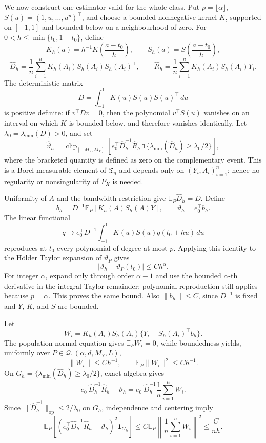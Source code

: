 We now construct one estimator valid for the whole class. Put \(p=\lfloor\alpha\rfloor\), \(S(u)=(1,u,\ldots,u^p)^\top\), and choose a bounded nonnegative kernel \(K\), supported on \([-1,1]\) and bounded below on a neighbourhood of zero. For \(0<h\le\min\{t_0,1-t_0\}\), define
\[
K_h(a)=h^{-1}K\!\left(\frac{a-t_0}{h}\right),
\qquad
S_h(a)=S\!\left(\frac{a-t_0}{h}\right),
\]
\[
\widehat D_h=\frac1n\sum_{i=1}^nK_h(A_i)S_h(A_i)S_h(A_i)^\top,
\qquad
\widehat R_h=\frac1n\sum_{i=1}^nK_h(A_i)S_h(A_i)Y_i.
\]
The deterministic matrix
\[
D=\int_{-1}^1K(u)S(u)S(u)^\top\,du
\]
is positive definite: if \(v^\top Dv=0\), then the polynomial \(v^\top S(u)\) vanishes on an interval on which \(K\) is bounded below, and therefore vanishes identically. Let \(\lambda_0=\lambda_{\min}(D)>0\), and set
\[
\widehat\vartheta_h=
\operatorname{clip}_{[-M_Y,M_Y]}\!\left[
 e_0^\top\widehat D_h^{-1}\widehat R_h\,
 \mathbf 1\{\lambda_{\min}(\widehat D_h)\ge\lambda_0/2\}
\right],
\]
where the bracketed quantity is defined as zero on the complementary event. This is a Borel measurable element of \(\mathfrak T_n\) and depends only on \((Y_i,A_i)_{i=1}^n\); hence no regularity or nonsingularity of \(P_X\) is needed.

Uniformity of \(A\) and the bandwidth restriction give \(\mathbb E_P\widehat D_h=D\). Define
\[
b_h=D^{-1}\mathbb E_P[K_h(A)S_h(A)Y],
\qquad
\vartheta_h=e_0^\top b_h.
\]
The linear functional
\[
q\longmapsto e_0^\top D^{-1}
\int_{-1}^1K(u)S(u)q(t_0+hu)\,du
\]
reproduces at \(t_0\) every polynomial of degree at most \(p\). Applying this identity to the H\"older Taylor expansion of \(\vartheta_P\) gives
\[
\lvert\vartheta_h-\vartheta_P(t_0)\rvert\le C h^\alpha.
\]
For integer \(\alpha\), expand only through order \(\alpha-1\) and use the bounded \(\alpha\)-th derivative in the integral Taylor remainder; polynomial reproduction still applies because \(p=\alpha\). This proves the same bound. Also \(\lVert b_h\rVert\le C\), since \(D^{-1}\) is fixed and \(Y\), \(K\), and \(S\) are bounded.

Let
\[
W_i=K_h(A_i)S_h(A_i)\{Y_i-S_h(A_i)^\top b_h\}.
\]
The population normal equation gives \(\mathbb E_PW_i=0\), while boundedness yields, uniformly over \(P\in\mathcal Q_1(\alpha,d,M_Y,L)\),
\[
\lVert W_i\rVert\le C h^{-1},
\qquad
\mathbb E_P\lVert W_i\rVert^2\le C h^{-1}.
\]
On \(G_h=\{\lambda_{\min}(\widehat D_h)\ge\lambda_0/2\}\), exact algebra gives
\[
e_0^\top\widehat D_h^{-1}\widehat R_h-\vartheta_h
=e_0^\top\widehat D_h^{-1}\frac1n\sum_{i=1}^nW_i.
\]
Since \(\lVert\widehat D_h^{-1}\rVert_{\mathrm{op}}\le2/\lambda_0\) on \(G_h\), independence and centering imply
\[
\mathbb E_P\!\left[
\left(e_0^\top\widehat D_h^{-1}\widehat R_h-\vartheta_h\right)^2
\mathbf 1_{G_h}
\right]
\le C\mathbb E_P\left\lVert\frac1n\sum_{i=1}^nW_i\right\rVert^2
\le\frac{C}{nh}.
\]

